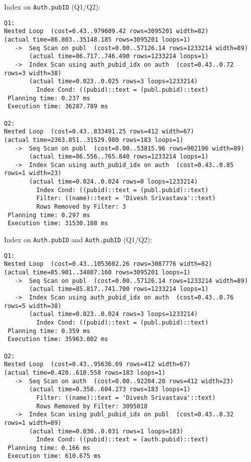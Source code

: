 \documentclass[11pt]{scrartcl}
\begin{document}
\noindent Index on {\tt Auth.pubID} (Q1/Q2):
{\small
\begin{verbatim}
Q1:
Nested Loop  (cost=0.43..979609.42 rows=3095201 width=82)
(actual time=86.803..35148.185 rows=3095201 loops=1)
   ->  Seq Scan on publ  (cost=0.00..57126.14 rows=1233214 width=89)
       (actual time=86.717..746.490 rows=1233214 loops=1)
   ->  Index Scan using auth_pubid_idx on auth  (cost=0.43..0.72 rows=3 width=38)
       (actual time=0.023..0.025 rows=3 loops=1233214)
         Index Cond: ((pubid)::text = (publ.pubid)::text)
 Planning time: 0.237 ms
 Execution time: 36287.789 ms

Q2:
Nested Loop  (cost=0.43..833491.25 rows=412 width=67)
(actual time=2363.851..31529.980 rows=183 loops=1)
   ->  Seq Scan on publ  (cost=0.00..53815.96 rows=902196 width=89)
       (actual time=86.556..765.840 rows=1233214 loops=1)
   ->  Index Scan using auth_pubid_idx on auth  (cost=0.43..0.85 rows=1 width=23)
       (actual time=0.024..0.024 rows=0 loops=1233214)
         Index Cond: ((pubid)::text = (publ.pubid)::text)
         Filter: ((name)::text = 'Divesh Srivastava'::text)
         Rows Removed by Filter: 3
 Planning time: 0.297 ms
 Execution time: 31530.108 ms
\end{verbatim}
}

\noindent Index on {\tt Auth.pubID} and {\tt Auth.pubID} (Q1/Q2):
{\small
\begin{verbatim}
Q1:
Nested Loop  (cost=0.43..1053602.26 rows=3087776 width=82)
(actual time=85.901..34807.160 rows=3095201 loops=1)
   ->  Seq Scan on publ  (cost=0.00..57126.14 rows=1233214 width=89)
       (actual time=85.817..741.700 rows=1233214 loops=1)
   ->  Index Scan using auth_pubid_idx on auth  (cost=0.43..0.76 rows=5 width=38)
       (actual time=0.023..0.024 rows=3 loops=1233214)
         Index Cond: ((pubid)::text = (publ.pubid)::text)
 Planning time: 0.359 ms
 Execution time: 35963.802 ms

Q2:
Nested Loop  (cost=0.43..95636.69 rows=412 width=67)
(actual time=0.420..610.558 rows=183 loops=1)
   ->  Seq Scan on auth  (cost=0.00..92204.20 rows=412 width=23)
       (actual time=0.358..604.273 rows=183 loops=1)
         Filter: ((name)::text = 'Divesh Srivastava'::text)
         Rows Removed by Filter: 3095018
   ->  Index Scan using publ_pubid_idx on publ  (cost=0.43..8.32 rows=1 width=89)
       (actual time=0.030..0.031 rows=1 loops=183)
         Index Cond: ((pubid)::text = (auth.pubid)::text)
 Planning time: 0.166 ms
 Execution time: 610.675 ms
\end{verbatim}
}
\end{document}

